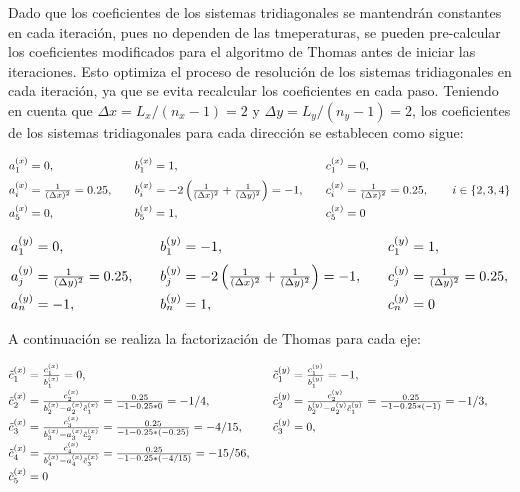 \documentclass[11pt,a4paper]{article}
\begin{document}
\medskip

Dado que los coeficientes de los sistemas tridiagonales se mantendr\'an constantes
en cada iteraci\'on, pues no dependen de las tmeperaturas, se pueden 
pre-calcular los coeficientes modificados para el algoritmo de Thomas antes 
de iniciar las iteraciones. Esto optimiza el proceso de resoluci\'on de los 
sistemas tridiagonales en cada iteraci\'on, ya que se evita recalcular los 
coeficientes en cada paso. Teniendo en cuenta que $\Delta x = L_x/(n_x - 1) = 2$
y $\Delta y = L_y/(n_y - 1) = 2$, los coeficientes de los sistemas tridiagonales 
para cada dirección se establecen como sigue:

\begin{equation}
\begin{array}{@{}l@{\qquad}l@{\qquad}l@{}}
a_1^{(x)} = 0, &
b_1^{(x)} = 1, &
c_1^{(x)} = 0, \\[0.6em]
a_i^{(x)} = \frac{1}{(\Delta x)^2} = 0.25, &
b_i^{(x)} = -2\left(\frac{1}{(\Delta x)^2}+\frac{1}{(\Delta y)^2}\right) = -1, &
c_i^{(x)} = \frac{1}{(\Delta x)^2} = 0.25, \qquad i \in \left\{ 2, 3, 4 \right\} \\[0.6em]
a_{5}^{(x)} = 0, &
b_{5}^{(x)} = 1, &
c_{5}^{(x)} = 0
\end{array}
\end{equation}

\bigskip

\begin{equation}
\begin{array}{@{}l@{\qquad}l@{\qquad}l@{}}
a_1^{(y)} = 0, &
b_1^{(y)} = -1, &
c_1^{(y)} = 1, \\[0.6em]
a_j^{(y)} = \frac{1}{(\Delta y)^2} = 0.25, &
b_j^{(y)} = -2\left(\frac{1}{(\Delta x)^2}+\frac{1}{(\Delta y)^2}\right) = -1, &
c_j^{(y)} = \frac{1}{(\Delta y)^2} = 0.25, \\[0.6em]
a_{n}^{(y)} = -1, &
b_{n}^{(y)} = 1, &
c_{n}^{(y)} = 0
\end{array}
\end{equation}

A continuaci\'on se realiza la factorizaci\'on de Thomas para cada eje:

\begin{equation}
\begin{array}{@{}l@{\qquad}l@{\qquad}l@{}}
\tilde{c}_1^{(x)} = \frac{c_1^{(x)}}{b_1^{(x)}} = 0, 
& \tilde{c}_1^{(y)} = \frac{c_1^{(y)}}{b_1^{(y)}} = -1, \\[0.6em]
\tilde{c}_2^{(x)} = \frac{c_2^{(x)}}{b_2^{(x)} - a_2^{(x)} \tilde{c}_1^{(x)}}
 = \frac{0.25}{-1 - 0.25*0} = -1/4, 
& \tilde{c}_2^{(y)} = \frac{c_2^{(y)}}{b_2^{(y)} - a_2^{(y)} \tilde{c}_1^{(y)}}
 = \frac{0.25}{-1 - 0.25*(-1)} = -1/3, \\[0.6em]
\tilde{c}_3^{(x)} = \frac{c_3^{(x)}}{b_3^{(x)} - a_3^{(x)} \tilde{c}_2^{(x)}}
 = \frac{0.25}{-1 - 0.25*(-0.25)} = -4/15,
& \tilde{c}_3^{(y)} = 0, \\[0.6em]
\tilde{c}_4^{(x)} = \frac{c_4^{(x)}}{b_4^{(x)} - a_4^{(x)} \tilde{c}_3^{(x)}}
 = \frac{0.25}{-1 - 0.25*(-4/15)} = -15/56,
& \\[0.6em]
\tilde{c}_5^{(x)} = 0 &  
\end{array}
\end{equation}
\end{document}
